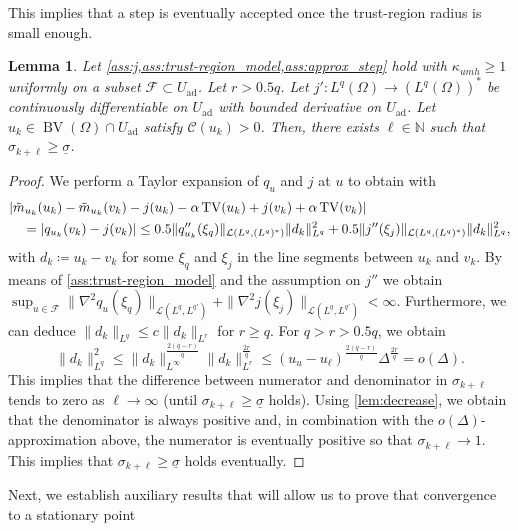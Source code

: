 \documentclass[11pt]{article}
\newcommand{\N}{\mathbb{N}}
\newcommand{\calC}{\mathcal{C}}
\newcommand{\calF}{\mathcal{F}}
\DeclareMathOperator*{\BV}{BV}
\DeclareMathOperator*{\TV}{TV}
\newcommand{\feas}{U_{\textrm{ad}}}
\newtheorem{lemma}[theorem]{Lemma}
\theoremstyle{definition}
\theoremstyle{remark}
\begin{document}
%
This implies that a step is eventually accepted
once the trust-region radius is small enough.
%
\begin{lemma}\label{lem:eventual_step_acceptance}
Let \cref{ass:j,ass:trust-region_model,ass:approx_step} hold with $\kappa_{umh} \ge 1$ uniformly on a subset $\calF \subset \feas$. Let $r > 0.5q$.
Let $j' : L^q(\Omega) \to (L^q(\Omega))^*$ be
continuously differentiable on $\feas$ with
bounded derivative on $\feas$.
Let $u_k \in \BV(\Omega) \cap \feas$ satisfy $\calC(u_k) > 0$.
Then, there exists $\ell \in \N$ such that $\sigma_{k + \ell} \ge \underline{\sigma}$.
\end{lemma}
\begin{proof}
We perform a Taylor expansion of $q_u$ and $j$ at $u$ to obtain with
%
\begin{gather}\label{eq:pred_vs_ared}
\begin{aligned}
\hspace{1em}&\hspace{-1em}
|\tilde{m}_{u_k}(u_k) - \tilde{m}_{u_k}(v_k) - j(u_k) - \alpha \TV(u_k) + j(v_k) + \alpha \TV(v_k)| \\
&= |q_{u_k}(v_k) - j(v_k)| \le 
0.5\|q_{u_k}''(\xi_q)\|_{\mathcal{L}(L^q,(L^{q})^*)}
\|d_k\|_{L^{q}}^2 
+ 
0.5\|j''(\xi_j)\|_{\mathcal{L}(L^{q},(L^q)^*)}
\|d_k\|_{L^{q}}^2,
\end{aligned}
\end{gather}
%
with $d_k \coloneqq u_k - v_k$
for some $\xi_q$ and $\xi_j$ in the line segments 
between $u_k$ and $v_k$.
By means of \cref{ass:trust-region_model} and the
assumption on $j''$ we obtain
$ \sup_{u \in \calF} \|\nabla^2 q_u(\xi_q) \|_{\mathcal{L}(L^{q},L^{q'})} + \|\nabla^2 j(\xi_j)\|_{\mathcal{L}(L^{q},L^{q'})} < \infty. $ 
Furthermore, we can deduce $\|d_k\|_{L^{q}} \le c \|d_k\|_{L^r}$ for $r \ge q$. For $q > r > 0.5 q$,
we obtain
%
\[ \|d_k\|_{L^{q}}^2 \le \|d_k\|_{L^\infty}^{\frac{2(q - r)}{q}} \|d_k\|_{L^r}^{\frac{2r}{q}}
\le (u_u - u_\ell)^{\frac{2(q - r)}{q}} \Delta^{\frac{2r}{q}}
= o(\Delta). \]
%
This implies that the difference between
numerator and denominator in $\sigma_{k+\ell}$
tends to zero as $\ell \to \infty$ (until
$\sigma_{k + \ell} \ge \underline{\sigma}$
holds).
Using \cref{lem:decrease},
we obtain that the denominator is always positive
and, in combination with the $o(\Delta)$-approximation
above, the numerator is eventually positive 
so that $\sigma_{k + \ell} \to 1$. This implies
that $\sigma_{k + \ell} \ge \underline{\sigma}$
holds eventually.
\end{proof}
%
Next, we establish auxiliary results that will allow us to prove that convergence to a stationary point 
\end{document}
